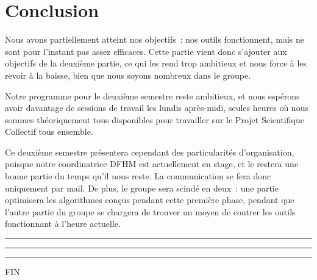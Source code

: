 \documentclass[a4paper, 12pt,twoside]{article}
\begin{document}


\clearpage
{}
\section*{Conclusion}%
    Nous avons partiellement atteint nos objectifs~: nos outils fonctionnent, mais ne sont pour l'instant pas assez efficaces. Cette partie vient donc s'ajouter aux objectifs de la deuxième partie, ce qui les rend trop ambitieux et nous force à les revoir à la baisse, bien que nous soyons nombreux dans le groupe.
    
    Notre programme pour le deuxième semestre reste ambitieux, et nous espérons avoir davantage de sessions de travail les lundis après-midi, seules heures où nous sommes théoriquement tous disponibles pour travailler sur le Projet Scientifique Collectif tous ensemble.
    
    Ce deuxième semestre présentera cependant des particularités d'organisation, puisque notre coordinatrice DFHM est actuellement en stage, et le restera une bonne partie du temps qu'il nous reste. La communication se fera donc uniquement par mail. De plus, le groupe sera scindé en deux~: une partie optimisera les algorithmes conçus pendant cette première phase, pendant que l'autre partie du groupe se chargera de trouver un moyen de contrer les outils fonctionnant à l'heure actuelle.
    
\begin{center}
\color{bleu303}

\rule{0.3\textwidth}{0.2mm}\vspace*{-3.5mm}

\rule{0.5\textwidth}{0.6mm}\vspace*{-3.8mm}

\rule{0.3\textwidth}{0.2mm}\vspace*{-1mm}

\sffamily FIN
\end{center}
\end{document}
